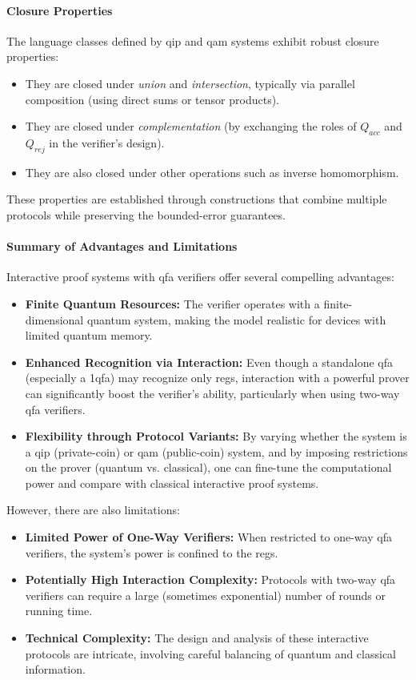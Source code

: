 \paragraph{Closure Properties}
The language classes defined by \gls{qip} and \gls{qam} systems exhibit robust closure properties:
\begin{itemize}
  \item They are closed under \emph{union} and \emph{intersection}, typically via parallel composition (using direct sums or tensor products).
  \item They are closed under \emph{complementation} (by exchanging the roles of $Q_{acc}$ and $Q_{rej}$ in the verifier's design).
  \item They are also closed under other operations such as inverse homomorphism.
\end{itemize}
These properties are established through constructions that combine multiple protocols while preserving the bounded-error guarantees.

\paragraph{Summary of Advantages and Limitations}
Interactive proof systems with qfa verifiers offer several compelling advantages:
\begin{itemize}
  \item \textbf{Finite Quantum Resources:} The verifier operates with a finite-dimensional quantum system, making the model realistic for devices with limited quantum memory.
  \item \textbf{Enhanced Recognition via Interaction:} Even though a standalone qfa (especially a 1qfa) may recognize only \glspl{reg}, interaction with a powerful prover can significantly boost the verifier's ability, particularly when using two-way qfa verifiers.
  \item \textbf{Flexibility through Protocol Variants:} By varying whether the system is a \gls{qip} (private-coin) or \gls{qam} (public-coin) system, and by imposing restrictions on the prover (quantum vs. classical), one can fine-tune the computational power and compare with classical interactive proof systems.
\end{itemize}
However, there are also limitations:
\begin{itemize}
  \item \textbf{Limited Power of One-Way Verifiers:} When restricted to one-way qfa verifiers, the system's power is confined to the \glspl{reg}.
  \item \textbf{Potentially High Interaction Complexity:} Protocols with two-way qfa verifiers can require a large (sometimes exponential) number of rounds or running time.
  \item \textbf{Technical Complexity:} The design and analysis of these interactive protocols are intricate, involving careful balancing of quantum and classical information.
\end{itemize}

